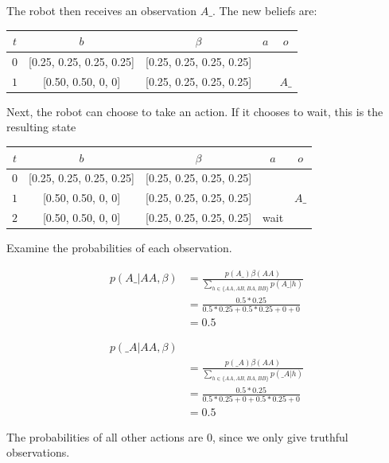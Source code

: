 \documentclass[conference]{IEEEtran}
\begin{document}
The robot then receives an observation $A\_$. The new beliefs are: 

\begin{center}
	\footnotesize
\begin{tabular}{|c| c| c| c | c|}
	\hline
	$t$ & $b$ & $\beta$ & $a$ & $o$ \\
	\hline
	$0$ & [0.25, 0.25, 0.25, 0.25] & [0.25, 0.25, 0.25, 0.25] & & \\
	\hline
	$1$ & [0.50, 0.50, 0, 0] & [0.25, 0.25, 0.25, 0.25] & & $A\_$ \\
	\hline
\end{tabular}
\end{center}

Next, the robot can choose to take an action. If it chooses to wait, this is the resulting state


\begin{center}
	\footnotesize
\begin{tabular}{|c| c| c| c | c|}
	\hline
	$t$ & $b$ & $\beta$ & $a$ & $o$ \\
	\hline
	$0$ & [0.25, 0.25, 0.25, 0.25] & [0.25, 0.25, 0.25, 0.25] & & \\
	\hline
	$1$ & [0.50, 0.50, 0, 0] & [0.25, 0.25, 0.25, 0.25] & & $A\_$ \\
	\hline
	$2$ & [0.50, 0.50, 0, 0] & [0.25, 0.25, 0.25, 0.25] & wait  &  \\
	\hline
\end{tabular}
\end{center}

Examine the probabilities of each observation.

\begin{align*}
	p(A\_ | AA, \beta) &= \frac{ p(A\_)\beta(AA) }{ \sum_{h \in \{AA, AB, BA, BB\}} p(A\_ | h) } \\
	&= \frac{0.5 * 0.25}{0.5 * 0.25 + 0.5 * 0.25 + 0 + 0} \\
	&= 0.5
\end{align*}

\begin{align*}
	p(\_A | AA, \beta) & \\
	&= \frac{ p(\_A)\beta(AA) }{ \sum_{h \in \{AA, AB, BA, BB\}} p(\_A | h) } \\
	&= \frac{0.5 * 0.25}{0.5 * 0.25 + 0 + 0.5 * 0.25 + 0} \\
	&= 0.5
\end{align*}

The probabilities of all other actions are 0, since we only give truthful observations.
\end{document}
